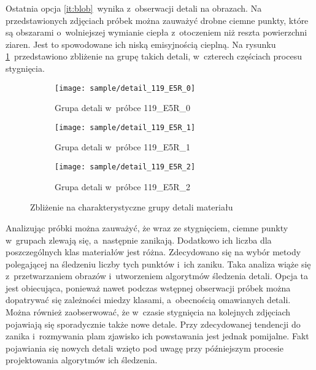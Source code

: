 Ostatnia opcja \ref{it:blob}~wynika z~obserwacji detali na obrazach.
Na przedstawionych zdjęciach próbek można zauważyć drobne ciemne punkty, które
są obszarami o~wolniejszej wymianie ciepła z~otoczeniem niż reszta powierzchni
ziaren.
Jest to spowodowane ich niską emisyjnością cieplną.
Na rysunku \ref{fig:blob_detail}~przedstawiono zbliżenie na grupę takich detali,
w~czterech częściach procesu stygnięcia.
\begin{figure}[h]
    \hspace*{\fill}
    \begin{subfigure}{0.3\textwidth}
        \centering
        \texttt{[image: sample/detail\_119\_E5R\_0]}
        \caption{Grupa detali w~próbce 119\_E5R\_0}
    \end{subfigure}
    \hfill
    \centering
    \begin{subfigure}{0.3\textwidth}
        \centering
        \texttt{[image: sample/detail\_119\_E5R\_1]}
        \caption{Grupa detali w~próbce 119\_E5R\_1}
    \end{subfigure}
    \hfill
    \begin{subfigure}{0.3\textwidth}
        \centering
        \texttt{[image: sample/detail\_119\_E5R\_2]}
        \caption{Grupa detali w~próbce 119\_E5R\_2}
    \end{subfigure}
    \hspace*{\fill}
    \caption{Zbliżenie na charakterystyczne grupy detali materiału}
    \label{fig:blob_detail}
\end{figure}

Analizując próbki można zauważyć, że wraz ze stygnięciem, ciemne punkty
w~grupach zlewają się, a~następnie zanikają.
Dodatkowo ich liczba dla poszczególnych klas materiałów jest różna.
Zdecydowano się na wybór metody polegającej na śledzeniu liczby tych punktów
i~ich zaniku.
Taka analiza wiąże się z~przetwarzaniem obrazów i~utworzeniem algorytmów
śledzenia detali.
Opcja ta jest obiecująca, ponieważ nawet podczas wstępnej obserwacji próbek
można dopatrywać się zależności miedzy klasami, a~obecnością omawianych detali.
Można również zaobserwować, że w~czasie stygnięcia na kolejnych zdjęciach
pojawiają się sporadycznie także nowe detale.
Przy zdecydowanej tendencji do zanika i~rozmywania plam zjawisko ich powstawania
jest jednak pomijalne.
Fakt pojawiania się nowych detali wzięto pod uwagę przy późniejszym procesie
projektowania algorytmów ich śledzenia.

